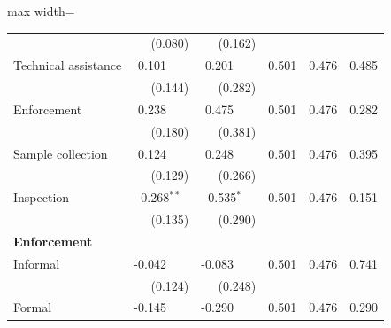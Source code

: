 \begin{table}[htbp]
{\begin{adjustbox}{max width=\linewidth}
\begin{tabular}{lrrrrr}
 & (\phantom{-}0.080)\phantom{$^{***}$} & (\phantom{-}0.162)\phantom{$^{***}$} &  &  &  \\
Technical assistance & \phantom{(}\phantom{-}0.101$^{\phantom{*}\phantom{*}\phantom{*}}$ & \phantom{(}\phantom{-}0.201$^{\phantom{*}\phantom{*}\phantom{*}}$ & \phantom{(}\phantom{-}0.501\phantom{$^{***}$} & \phantom{(}\phantom{-}0.476\phantom{$^{***}$} & \phantom{(}\phantom{-}0.485\phantom{$^{***}$} \\
 & (\phantom{-}0.144)\phantom{$^{***}$} & (\phantom{-}0.282)\phantom{$^{***}$} &  &  &  \\
Enforcement & \phantom{(}\phantom{-}0.238$^{\phantom{*}\phantom{*}\phantom{*}}$ & \phantom{(}\phantom{-}0.475$^{\phantom{*}\phantom{*}\phantom{*}}$ & \phantom{(}\phantom{-}0.501\phantom{$^{***}$} & \phantom{(}\phantom{-}0.476\phantom{$^{***}$} & \phantom{(}\phantom{-}0.282\phantom{$^{***}$} \\
 & (\phantom{-}0.180)\phantom{$^{***}$} & (\phantom{-}0.381)\phantom{$^{***}$} &  &  &  \\
Sample collection & \phantom{(}\phantom{-}0.124$^{\phantom{*}\phantom{*}\phantom{*}}$ & \phantom{(}\phantom{-}0.248$^{\phantom{*}\phantom{*}\phantom{*}}$ & \phantom{(}\phantom{-}0.501\phantom{$^{***}$} & \phantom{(}\phantom{-}0.476\phantom{$^{***}$} & \phantom{(}\phantom{-}0.395\phantom{$^{***}$} \\
 & (\phantom{-}0.129)\phantom{$^{***}$} & (\phantom{-}0.266)\phantom{$^{***}$} &  &  &  \\
Inspection & \phantom{(}\phantom{-}0.268$^{**\phantom{*}}$ & \phantom{(}\phantom{-}0.535$^{*\phantom{*}\phantom{*}}$ & \phantom{(}\phantom{-}0.501\phantom{$^{***}$} & \phantom{(}\phantom{-}0.476\phantom{$^{***}$} & \phantom{(}\phantom{-}0.151\phantom{$^{***}$} \\
 & (\phantom{-}0.135)\phantom{$^{***}$} & (\phantom{-}0.290)\phantom{$^{***}$} &  &  &  \\
\multicolumn{6}{l}{\textbf{Enforcement}} \\
Informal & \phantom{(}-0.042$^{\phantom{*}\phantom{*}\phantom{*}}$ & \phantom{(}-0.083$^{\phantom{*}\phantom{*}\phantom{*}}$ & \phantom{(}\phantom{-}0.501\phantom{$^{***}$} & \phantom{(}\phantom{-}0.476\phantom{$^{***}$} & \phantom{(}\phantom{-}0.741\phantom{$^{***}$} \\
 & (\phantom{-}0.124)\phantom{$^{***}$} & (\phantom{-}0.248)\phantom{$^{***}$} &  &  &  \\
Formal & \phantom{(}-0.145$^{\phantom{*}\phantom{*}\phantom{*}}$ & \phantom{(}-0.290$^{\phantom{*}\phantom{*}\phantom{*}}$ & \phantom{(}\phantom{-}0.501\phantom{$^{***}$} & \phantom{(}\phantom{-}0.476\phantom{$^{***}$} & \phantom{(}\phantom{-}0.290\phantom{$^{***}$} \\

\end{tabular}
\end{adjustbox}}
\end{table}
